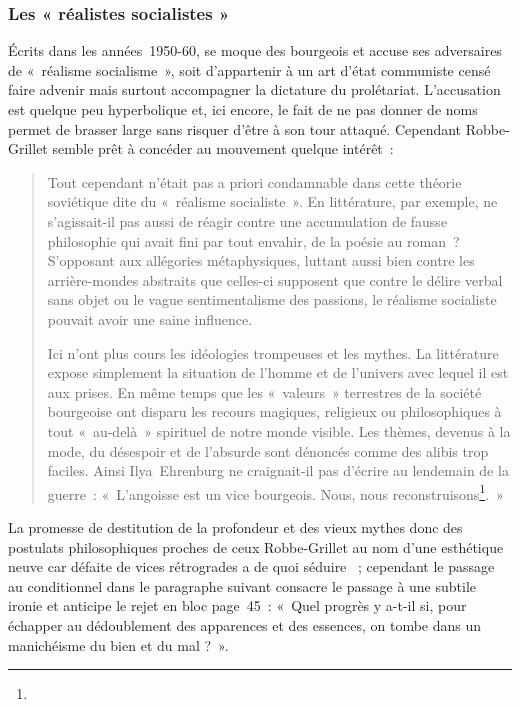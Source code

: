 \documentclass[12pt, a4paper]{article}
\begin{document}
\subsubsection{Les « réalistes socialistes »}
\label{engages}
Écrits dans les années~1950-60, \punr{} se moque des bourgeois et accuse ses adversaires de «~réalisme socialisme~», soit d'appartenir à un art d'état communiste censé faire advenir mais surtout accompagner la dictature du prolétariat. L'accusation est quelque peu hyperbolique et, ici encore, le fait de ne pas donner de noms permet de brasser large sans risquer d'être à son tour attaqué. Cependant Robbe-Grillet semble prêt à concéder au mouvement quelque intérêt~:
\begin{quote}
    Tout cependant n’était pas a priori condamnable dans cette théorie soviétique dite du «~réalisme socialiste~». En littérature, par exemple, ne s’agissait-il pas aussi de réagir contre une accumulation de fausse philosophie qui avait fini par tout envahir, de la poésie au roman~? S’opposant aux allégories métaphysiques, luttant aussi bien contre les arrière-mondes abstraits que celles-ci supposent que contre le délire verbal sans objet ou le vague sentimentalisme des passions, le réalisme socialiste pouvait avoir une saine influence.

    Ici n’ont plus cours les idéologies trompeuses et les mythes. La littérature expose simplement la situation de l’homme et de l’univers avec lequel il est aux prises. En même temps que les «~valeurs~» terrestres de la société bourgeoise ont disparu les recours magiques, religieux ou philosophiques à tout «~au-delà~» spirituel de notre monde visible. Les thèmes, devenus à la mode, du désespoir et de l’absurde sont dénoncés comme des alibis trop faciles. Ainsi Ilya~Ehrenburg ne craignait-il pas d’écrire au lendemain de la guerre~: «~L’angoisse est un vice bourgeois. Nous, nous reconstruisons\footnote{}.~»
\end{quote}
La promesse de destitution de la profondeur et des vieux mythes donc des postulats philosophiques proches de ceux Robbe-Grillet au nom d'une esthétique neuve car défaite de vices rétrogrades a de quoi séduire \robbe{}~; cependant le passage au conditionnel dans le paragraphe suivant consacre le passage à une subtile ironie et anticipe le rejet en bloc page~45~: «~Quel progrès y a-t-il si, pour échapper au dédoublement des apparences et des essences, on tombe dans un manichéisme du bien et du mal ?~».
\end{document}
